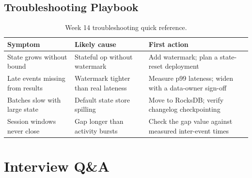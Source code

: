 \subsection{Troubleshooting Playbook}
\begin{table}[H]
\centering
\small
\begin{tabular}{@{}p{3.6cm}p{4.2cm}p{4.8cm}@{}}
\toprule
\textbf{Symptom} & \textbf{Likely cause} & \textbf{First action} \\
\midrule
State grows without bound & Stateful op without watermark & Add watermark; plan a state-reset deployment \\
Late events missing from results & Watermark tighter than real lateness & Measure p99 lateness; widen with a data-owner sign-off \\
Batches slow with large state & Default state store spilling & Move to RocksDB; verify changelog checkpointing \\
Session windows never close & Gap longer than activity bursts & Check the gap value against measured inter-event times \\
\bottomrule
\end{tabular}
\caption{Week 14 troubleshooting quick reference.}
\label{tab:ch14-trouble}
\end{table}

\section{Interview Q\&A}
